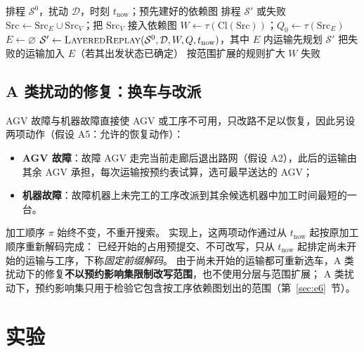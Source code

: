 \documentclass[manuscript,screen,review]{acmart}
\begin{document}
\begin{algorithm}[t]
\caption{分层有界修复（划界 + 分层改写 + 失败后重试）}
\label{alg:strc_repair}
\begin{algorithmic}[1]
\Require 排程 \(\mathcal{S}^0\)，扰动 \(\mathcal{D}\)，时刻 \(t_{\mathrm{now}}\)；预先建好的依赖图
\Ensure 排程 \(\mathcal{S}'\) 或失败
\State \(\mathrm{Src}\gets\mathrm{Src}_E\cup\mathrm{Src}_V\)；把 \(\mathrm{Src}_V\) 接入依赖图
\State \(W \gets \tau(\mathrm{Cl}(\mathrm{Src}))\)；\(Q_0\gets\tau(\mathrm{Src}_E)\)
   
    \State \(E\gets\varnothing\)
    \Repeat
      \State \(\mathcal{S}' \gets \textsc{LayeredReplay}(\mathcal{S}^0,\mathcal{D},W,Q,t_{\mathrm{now}})\)，其中 \(E\) 内运输先规划
        \State \Return \(\mathcal{S}'\)
      \EndIf
      \State 把失败的运输加入 \(E\)（若其出发状态已确定）
  \EndFor
  \State 按范围扩展的规则扩大 \(W\) 
\EndFor
\State \Return 失败
\end{algorithmic}
\end{algorithm}

\subsection{A 类扰动的修复：换车与改派}
\label{sec:afault}

AGV 故障与机器故障直接使 AGV 或工序不可用，只改路不足以恢复，因此另设两项动作（假设 A5：允许的恢复动作）：
\begin{itemize}[leftmargin=1.5em,itemsep=0.15em]
\item \textbf{AGV 故障}：故障 AGV 走完当前走廊后退出路网（假设 A2），此后的运输由其余 AGV 承担，每次运输按预约表试算，选可最早送达的 AGV；
\item \textbf{机器故障}：故障机器上未完工的工序改派到其余候选机器中加工时间最短的一台。
\end{itemize}
加工顺序 \(\pi\) 始终不变，不重开搜索。
实现上，这两项动作通过从 \(t_{\mathrm{now}}\) 起按原加工顺序重新解码完成：
已经开始的占用预提交、不可改写，只从 \(t_{\mathrm{now}}\) 起排定尚未开始的运输与工序，下称\emph{固定前缀解码}。
由于尚未开始的运输都可重新选车，A 类扰动下的修复\textbf{不以预约影响集限制改写范围}，也不使用分层与范围扩展；
A 类扰动下，预约影响集只用于检验它包含按工序依赖图划出的范围（第~\ref{sec:e6}~节）。


\section{实验}
\label{sec:experiments}
\end{document}
